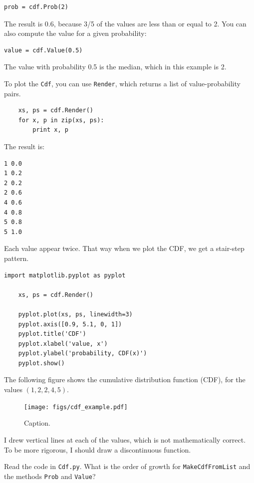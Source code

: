 \documentclass[10pt]{book}
\begin{document}
\begin{verbatim}
prob = cdf.Prob(2)
\end{verbatim}

The result is 0.6, because 3/5 of the values are less than or equal to 2.
You can also compute the value for a given probability:

\begin{verbatim}
value = cdf.Value(0.5)
\end{verbatim}

The value with probability 0.5 is the median, which in this example is 2.

To plot the {\tt Cdf}, you can use {\tt Render}, which returns
a list of value-probability pairs.

\begin{verbatim}
    xs, ps = cdf.Render()
    for x, p in zip(xs, ps):
        print x, p
\end{verbatim}

The result is:

\begin{verbatim}
1 0.0
1 0.2
2 0.2
2 0.6
4 0.6
4 0.8
5 0.8
5 1.0
\end{verbatim}

Each value appear twice.  That way when we plot the
CDF, we get a stair-step pattern.

\begin{verbatim}
import matplotlib.pyplot as pyplot

    xs, ps = cdf.Render()

    pyplot.plot(xs, ps, linewidth=3)
    pyplot.axis([0.9, 5.1, 0, 1])
    pyplot.title('CDF')
    pyplot.xlabel('value, x')
    pyplot.ylabel('probability, CDF(x)')
    pyplot.show()
\end{verbatim}

The following figure shows the cumulative distribution
function (CDF), for the values $(1,2,2,4,5)$.

\begin{figure}
\centerline{\texttt{[image: figs/cdf\_example.pdf]}}
\caption{Caption.}
\end{figure}

I drew vertical lines at each of the values, which is not
mathematically correct.  To be more rigorous, I should draw
a discontinuous function.

\begin{exercise}

Read the code in {\tt Cdf.py}.  What is the order of growth for
{\tt MakeCdfFromList} and the methods {\tt Prob} and {\tt Value}?
\end{exercise}
\end{document}
